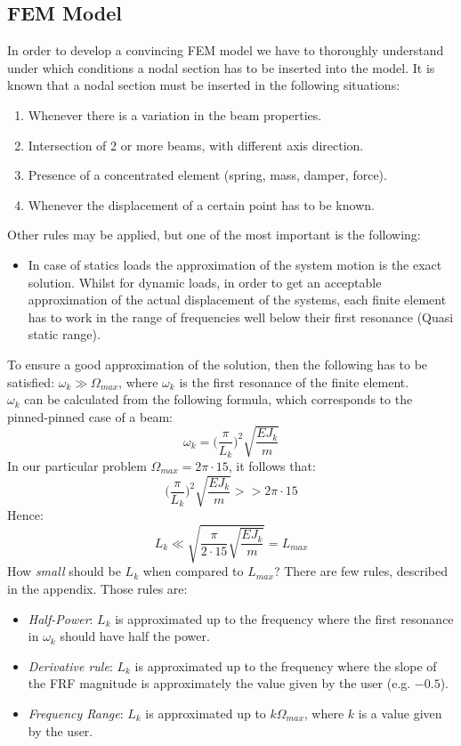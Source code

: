 \documentclass[10pt,a4paper,final]{report}
\begin{document}
\subsection{FEM Model}
In order to develop a convincing FEM model we have to thoroughly understand under which conditions a nodal section has to be inserted into the model. It is known that a nodal section must be inserted in the following situations:
\begin{enumerate}
\item Whenever there is a variation in the beam properties.
\item Intersection of 2 or more beams, with different axis direction.
\item Presence of a concentrated element (spring, mass, damper, force).
\item Whenever the displacement of a certain point has to be known.
\end{enumerate}
Other rules may be applied, but one of the most important is the following:
\begin{itemize}
\item {In case of  statics loads the approximation of the system motion is the exact solution. Whilst for dynamic loads, in order to get an acceptable approximation of the actual displacement of the systems, each finite element has to work in the range of frequencies well below their first resonance (Quasi static range).
}
\end{itemize}
To ensure a good approximation of the solution, then the following has to be satisfied: $\omega_{k} \gg \Omega_{max}$, where $\omega_{k}$ is the first resonance of the finite element.
\\
$\omega_{k}$ can be calculated from the following formula,  which corresponds to the pinned-pinned case of a beam:
$$\omega_{k} =  \Big(\frac{\pi}{L_{k}}\Big)^2 \sqrt{\frac{EJ_k}{m}}$$
In our particular problem $\Omega_{max} = 2\pi \cdot15$, it follows that:
$$\Big(\frac{\pi}{L_{k}}\Big)^2 \sqrt{\frac{EJ_k}{m}} >> 2\pi \cdot15$$
Hence:
$$L_k \ll \sqrt{\frac{\pi}{2 \cdot 15} \sqrt{\frac{EJ_k}{m}}} = L_{max}$$
How \textit{small} should be $L_k$ when compared to $L_{max}$? There are few rules, described in the appendix. Those rules are:
\begin{itemize}
\item \textit{Half-Power}: $L_k$ is approximated up to the frequency where the first resonance in $\omega_k$ should have half the power.
\item \textit{Derivative rule}: $L_k$ is approximated up to the frequency where the slope of the FRF magnitude is approximately the value given by the user (e.g. $-0.5$).
\item \textit{Frequency Range}: $L_k$ is approximated up to $k\Omega_{max}$, where $k$ is a value given by the user.
\end{itemize}
\end{document}

